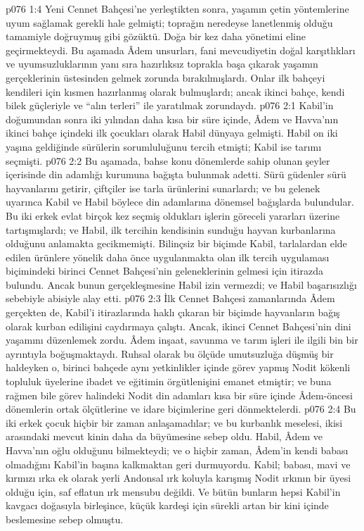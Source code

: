 \vs p076 1:4 Yeni Cennet Bahçesi’ne yerleştikten sonra, yaşamın çetin yöntemlerine uyum sağlamak gerekli hale gelmişti; toprağın neredeyse lanetlenmiş olduğu tamamiyle doğruymuş gibi gözüktü. Doğa bir kez daha yönetimi eline geçirmekteydi. Bu aşamada Âdem unsurları, fani mevcudiyetin doğal karşıtlıkları ve uyumsuzluklarının yanı sıra hazırlıksız toprakla başa çıkarak yaşamın gerçeklerinin üstesinden gelmek zorunda bırakılmışlardı. Onlar ilk bahçeyi kendileri için kısmen hazırlanmış olarak bulmuşlardı; ancak ikinci bahçe, kendi bilek güçleriyle ve “alın terleri” ile yaratılmak zorundaydı.
\vs p076 2:1 Kabil’in doğumundan sonra iki yılından daha kısa bir süre içinde, Âdem ve Havva’nın ikinci bahçe içindeki ilk çocukları olarak Habil dünyaya gelmişti. Habil on iki yaşına geldiğinde sürülerin sorumluluğunu tercih etmişti; Kabil ise tarımı seçmişti.
\vs p076 2:2 Bu aşamada, bahse konu dönemlerde sahip olunan şeyler içerisinde din adamlığı kurumuna bağışta bulunmak adetti. Sürü güdenler sürü hayvanlarını getirir, çiftçiler ise tarla ürünlerini sunarlardı; ve bu gelenek uyarınca Kabil ve Habil böylece din adamlarına dönemsel bağışlarda bulundular. Bu iki erkek evlat birçok kez seçmiş oldukları işlerin göreceli yararları üzerine tartışmışlardı; ve Habil, ilk tercihin kendisinin sunduğu hayvan kurbanlarına olduğunu anlamakta gecikmemişti. Bilinçsiz bir biçimde Kabil, tarlalardan elde edilen ürünlere yönelik daha önce uygulanmakta olan ilk tercih uygulaması biçimindeki birinci Cennet Bahçesi’nin geleneklerinin gelmesi için itirazda bulundu. Ancak bunun gerçekleşmesine Habil izin vermezdi; ve Habil başarısızlığı sebebiyle abisiyle alay etti.
\vs p076 2:3 İlk Cennet Bahçesi zamanlarında Âdem gerçekten de, Kabil’i itirazlarında haklı çıkaran bir biçimde hayvanların bağış olarak kurban edilişini caydırmaya çalıştı. Ancak, ikinci Cennet Bahçesi’nin dini yaşamını düzenlemek zordu. Âdem inşaat, savunma ve tarım işleri ile ilgili bin bir ayrıntıyla boğuşmaktaydı. Ruhsal olarak bu ölçüde umutsuzluğa düşmüş bir haldeyken o, birinci bahçede aynı yetkinlikler içinde görev yapmış Nodit kökenli topluluk üyelerine ibadet ve eğitimin örgütlenişini emanet etmiştir; ve buna rağmen bile görev halindeki Nodit din adamları kısa bir süre içinde Âdem\hyp{}öncesi dönemlerin ortak ölçütlerine ve idare biçimlerine geri dönmektelerdi.
\vs p076 2:4 Bu iki erkek çocuk hiçbir bir zaman anlaşamadılar; ve bu kurbanlık meselesi, ikisi arasındaki mevcut kinin daha da büyümesine sebep oldu. Habil, Âdem ve Havva’nın oğlu olduğunu bilmekteydi; ve o hiçbir zaman, Âdem’in kendi babası olmadığını Kabil’in başına kalkmaktan geri durmuyordu. Kabil; babası, mavi ve kırmızı ırka ek olarak yerli Andonsal ırk koluyla karışmış Nodit ırkının bir üyesi olduğu için, saf eflatun ırk mensubu değildi. Ve bütün bunların hepsi Kabil’in kavgacı doğasıyla birleşince, küçük kardeşi için sürekli artan bir kini içinde beslemesine sebep olmuştu.
